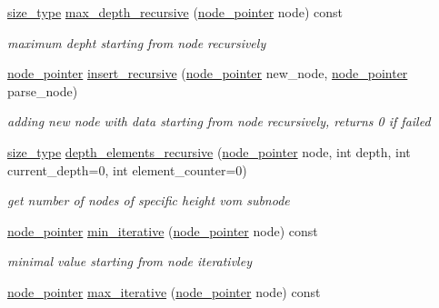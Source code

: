 \begin{DoxyCompactItemize}
\hyperlink{structcrap_1_1tree__node_a78f219a12c6715d77966184e41efc4cd}{size\-\_\-type} \hyperlink{structcrap_1_1tree__node_a2825fc8687312dc261c64707f9f002b6}{max\-\_\-depth\-\_\-recursive} (\hyperlink{structcrap_1_1tree__node_a66cd96114fc5aaf9806032e15960edc5}{node\-\_\-pointer} node) const 
\begin{DoxyCompactList}\small\item\em maximum depht starting from node recursively \end{DoxyCompactList}\item 
\hyperlink{structcrap_1_1tree__node_a66cd96114fc5aaf9806032e15960edc5}{node\-\_\-pointer} \hyperlink{structcrap_1_1tree__node_acc264919b0c1f5b8f291aac0fa12626e}{insert\-\_\-recursive} (\hyperlink{structcrap_1_1tree__node_a66cd96114fc5aaf9806032e15960edc5}{node\-\_\-pointer} new\-\_\-node, \hyperlink{structcrap_1_1tree__node_a66cd96114fc5aaf9806032e15960edc5}{node\-\_\-pointer} parse\-\_\-node)
\begin{DoxyCompactList}\small\item\em adding new node with data starting from node recursively, returns 0 if failed \end{DoxyCompactList}\item 
\hyperlink{structcrap_1_1tree__node_a78f219a12c6715d77966184e41efc4cd}{size\-\_\-type} \hyperlink{structcrap_1_1tree__node_af18dc9e1ed942ca61b91890df57171d6}{depth\-\_\-elements\-\_\-recursive} (\hyperlink{structcrap_1_1tree__node_a66cd96114fc5aaf9806032e15960edc5}{node\-\_\-pointer} node, int depth, int current\-\_\-depth=0, int element\-\_\-counter=0)
\begin{DoxyCompactList}\small\item\em get number of nodes of specific height vom subnode \end{DoxyCompactList}\item 
\hyperlink{structcrap_1_1tree__node_a66cd96114fc5aaf9806032e15960edc5}{node\-\_\-pointer} \hyperlink{structcrap_1_1tree__node_a520ccd009008c450c86f2d0338018908}{min\-\_\-iterative} (\hyperlink{structcrap_1_1tree__node_a66cd96114fc5aaf9806032e15960edc5}{node\-\_\-pointer} node) const 
\begin{DoxyCompactList}\small\item\em minimal value starting from node iterativley \end{DoxyCompactList}\item 
\hyperlink{structcrap_1_1tree__node_a66cd96114fc5aaf9806032e15960edc5}{node\-\_\-pointer} \hyperlink{structcrap_1_1tree__node_a47e3caa06d8bcd11b71611ded2e5a924}{max\-\_\-iterative} (\hyperlink{structcrap_1_1tree__node_a66cd96114fc5aaf9806032e15960edc5}{node\-\_\-pointer} node) const 

\end{DoxyCompactItemize}
